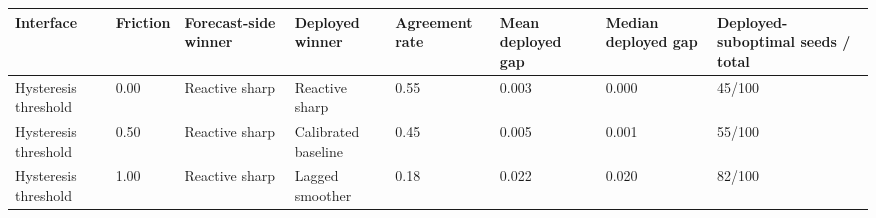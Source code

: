 \begin{tabular}{llllllll}
\toprule
Interface & Friction & Forecast-side winner & Deployed winner & Agreement rate & Mean deployed gap & Median deployed gap & Deployed-suboptimal seeds / total \\
\midrule
Hysteresis threshold & 0.00 & Reactive sharp & Reactive sharp & 0.55 & 0.003 & 0.000 & 45/100 \\
Hysteresis threshold & 0.50 & Reactive sharp & Calibrated baseline & 0.45 & 0.005 & 0.001 & 55/100 \\
Hysteresis threshold & 1.00 & Reactive sharp & Lagged smoother & 0.18 & 0.022 & 0.020 & 82/100 \\
\bottomrule
\end{tabular}
